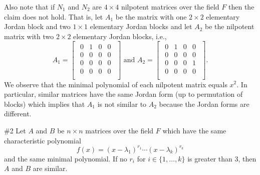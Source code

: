 \documentclass{article}
\begin{document}
	Also note that if $N_1$ and $N_2$ are $4\times 4$ nilpotent matrices over the field $F$ then the claim does not hold. That is, let $A_1$ be the matrix with one $2\times 2$ elementary Jordan block and two $1\times 1$ elementary Jordan blocks and let $A_2$ be the nilpotent matrix with two $2\times 2$ elementary Jordan blocks, i.e., 	
	\[ A_1 = \begin{bmatrix}
		\begin{array}{cccc}
 			0 & 1 & 0 & 0 \\
 			0 & 0 & 0 & 0 \\
 			0 & 0 & 0 & 0 \\
 			0 & 0 & 0 & 0 \\
		\end{array}
	\end{bmatrix}
	\text{ and }
	A_2 =\begin{bmatrix}
		\begin{array}{cccc}
 			0 & 1 & 0 & 0 \\
 			0 & 0 & 0 & 0 \\
 			0 & 0 & 0 & 1 \\
 			0 & 0 & 0 & 0 \\
		\end{array}
	\end{bmatrix}.\]
We observe that the minimal polynomial of each nilpotent matrix equals $x^2$. In particular, similar matrices have the same Jordan form (up to permutation of blocks) which implies that $A_1$ is not similar to $A_2$ because the Jordan forms are different.\\

\break

\begin{problem}{\#2} Let $A$ and $B$ be $n\times n$ matrices over the field $F$ which have the same characteristic polynomial
	\[f(x) = (x - \lambda_1)^{r_1} \cdots (x - \lambda_k)^{r_k}\]
and the same minimal polynomial. If no $r_i$ for $i\in \{1, \dots, k\}$ is greater than 3, then $A$ and $B$ are similar.
\end{problem}

			
				
\end{document}
